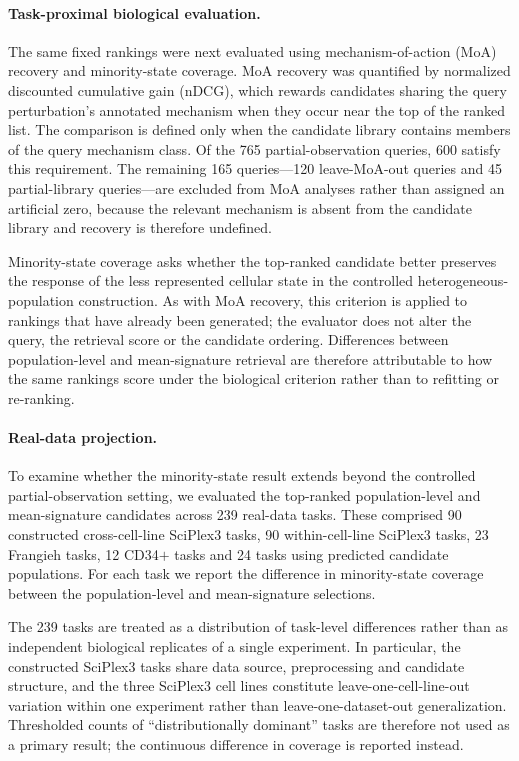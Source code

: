 \documentclass[11pt,letterpaper]{article}
\begin{document}
\paragraph{Task-proximal biological evaluation.}
The same fixed rankings were next evaluated using mechanism-of-action (MoA) recovery and
minority-state coverage. MoA recovery was quantified by normalized discounted cumulative gain
(nDCG)\cite{nDCG}, which rewards candidates sharing the query perturbation's annotated mechanism
when they occur near the top of the ranked list. The comparison is defined only when the candidate
library contains members of the query mechanism class. Of the 765 partial-observation queries,
600 satisfy this requirement. The remaining 165 queries---120 leave-MoA-out queries and 45
partial-library queries---are excluded from MoA analyses rather than assigned an artificial zero,
because the relevant mechanism is absent from the candidate library and recovery is therefore
undefined.

Minority-state coverage asks whether the top-ranked candidate better preserves the response of the
less represented cellular state in the controlled heterogeneous-population construction. As with
MoA recovery, this criterion is applied to rankings that have already been generated; the evaluator
does not alter the query, the retrieval score or the candidate ordering. Differences between
population-level and mean-signature retrieval are therefore attributable to how the same rankings
score under the biological criterion rather than to refitting or re-ranking.

\paragraph{Real-data projection.}
To examine whether the minority-state result extends beyond the controlled partial-observation
setting, we evaluated the top-ranked population-level and mean-signature candidates across 239
real-data tasks. These comprised 90 constructed cross-cell-line SciPlex3 tasks, 90 within-cell-line
SciPlex3 tasks, 23 Frangieh tasks, 12 CD34$+$ tasks and 24 tasks using predicted candidate
populations. For each task we report the difference in minority-state coverage between the
population-level and mean-signature selections.

The 239 tasks are treated as a distribution of task-level differences rather than as independent
biological replicates of a single experiment. In particular, the constructed SciPlex3 tasks share
data source, preprocessing and candidate structure, and the three SciPlex3 cell lines constitute
leave-one-cell-line-out variation within one experiment rather than leave-one-dataset-out
generalization. Thresholded counts of ``distributionally dominant'' tasks are therefore not used as
a primary result; the continuous difference in coverage is reported instead.
\end{document}
